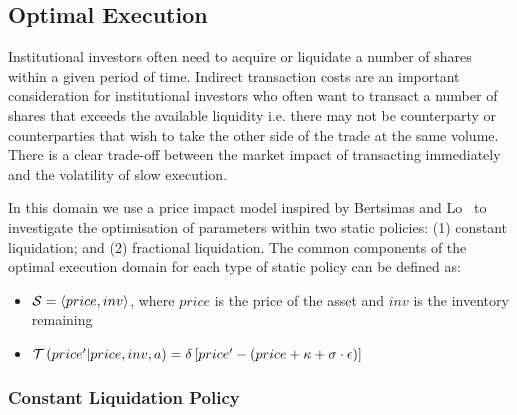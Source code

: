 
\subsection{Optimal Execution}
\label{sec:results_oe}

Institutional investors often need to acquire or liquidate a number of shares within a given period of time. Indirect transaction costs are an important consideration for institutional investors who often want to transact a number of shares that exceeds the available liquidity i.e. there may not be counterparty or counterparties that wish to take the other side of the trade at the same volume. There is a clear trade-off between the market impact of transacting immediately and the volatility of slow execution. 

In this domain we use a price impact model inspired by Bertsimas and Lo~\parencite{Bertsimas_JFM_1998} to investigate the optimisation of parameters within two static policies: (1) constant liquidation; and (2) fractional liquidation. The common components of the optimal execution domain for each type of static policy can be defined as:
\begin{itemize}
    \item {\footnotesize $ \mathcal{S} = \left\langle price, inv \right\rangle$}, where $ price $ is the price of the asset and $ inv $ is the inventory remaining
    \item  {\footnotesize $ \mathcal{T}\left( price' | price, inv, a \right) = \delta \left[ price' - (price + \kappa + \sigma \cdot \epsilon) \right] $}
\end{itemize}

\subsubsection{Constant Liquidation Policy}
\label{sec:results_oe_constant}

